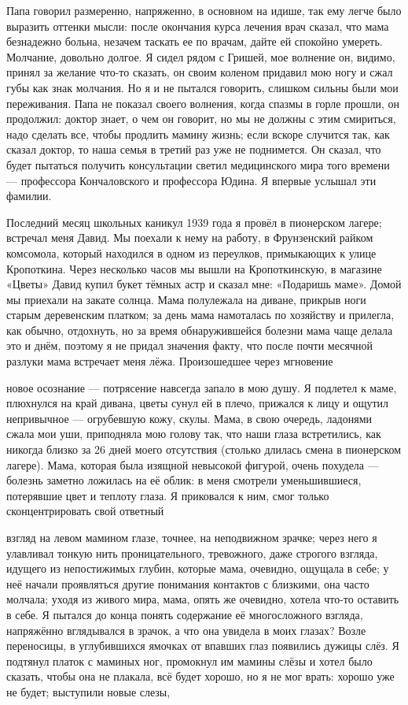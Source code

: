 \label{181-1}
Папа говорил размеренно, напряженно, в основном на идише, так ему легче было выразить оттенки мысли: после окончания курса лечения врач сказал, что мама безнадежно больна, незачем таскать ее по врачам, дайте ей спокойно умереть. Молчание, довольно долгое. Я сидел рядом с Гришей, мое волнение он, видимо, принял за желание что-то сказать, он своим коленом придавил мою ногу и сжал губы как знак молчания. Но я и не пытался говорить, слишком сильны были мои переживания. Папа не показал своего волнения, когда спазмы в горле прошли, он продолжил: доктор знает, о чем он говорит, но мы не должны с этим смириться, надо сделать все, чтобы продлить мамину жизнь; если вскоре случится так, как сказал доктор, то наша семья в третий раз уже не поднимется. Он сказал, что будет пытаться получить консультации светил медицинского мира того времени — профессора Кончаловского и профессора Юдина. Я впервые услышал эти фамилии.

\label{182-1}
Последний месяц школьных каникул 1939 года я провёл в пионерском лагере; встречал меня Давид. Мы поехали к нему на работу, в Фрунзенский райком комсомола, который находился в одном из переулков, примыкающих к улице Кропоткина. Через несколько часов мы вышли на Кропоткинскую, в магазине «Цветы» Давид купил букет тёмных астр и сказал мне: «Подаришь маме». Домой мы приехали на закате солнца. Мама полулежала на диване, прикрыв ноги старым деревенским платком; за день мама намоталась по хозяйству и прилегла, как обычно, отдохнуть, но за время обнаружившейся болезни мама чаще делала это и днём, поэтому я не придал значения факту, что после почти месячной разлуки мама встречает меня лёжа. Произошедшее через мгновение

\label{183-1}
новое осознание — потрясение навсегда запало в мою душу.
Я подлетел к маме, плюхнулся на край дивана, цветы сунул ей в плечо, прижался к лицу и ощутил непривычное — огрубевшую кожу, скулы. Мама, в свою очередь, ладонями сжала мои уши, приподняла мою голову так, что наши глаза встретились, как никогда близко за 26 дней моего отсутствия (столько длилась смена в пионерском лагере). Мама, которая была изящной невысокой фигурой, очень похудела — болезнь заметно ложилась на её облик: в меня смотрели уменьшившиеся, потерявшие цвет и теплоту глаза. Я приковался к ним, смог только сконцентрировать свой ответный

\label{184-1}
взгляд на левом мамином глазе, точнее, на неподвижном зрачке; через него я улавливал тонкую нить проницательного, тревожного, даже строгого взгляда, идущего из непостижимых глубин, которые мама, очевидно, ощущала в себе; у неё начали проявляться другие понимания контактов с близкими, она часто молчала; уходя из живого мира, мама, опять же очевидно, хотела что-то оставить в себе. Я пытался до конца понять содержание её многосложного взгляда, напряжённо вглядывался в зрачок, а что она увидела в моих глазах? Возле переносицы, в углубившихся ямочках от впавших глаз появились дужицы слёз. Я подтянул платок с маминых ног, промокнул им мамины слёзы и хотел было сказать, чтобы она не плакала, всё будет хорошо, но я не мог врать: хорошо уже не будет; выступили новые слезы,

